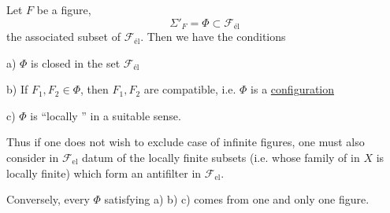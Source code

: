 Let $F$ be a figure, 
\[
\Sigma'_F=\Phi\subset\mathcal{F}_{\text{él}}
\]
the associated subset of $\mathcal{F}_{\text{él}}$. Then we have the conditions

a) $\Phi$ is closed in the  set $\mathcal{F}_{\text{él}}$

b) If  $F_1,F_2\in\Phi$,  then $F_1,F_2$ are compatible, i.e. $\Phi$ is a \uline{configuration}

c) $\Phi$ is ``locally '' in a suitable sense.

Thus if one does not wish to exclude  case of infinite figures, one must also consider in $\mathcal{F}_{\text{el}}$  datum of the locally finite subsets (i.e. whose family of  in $X$ is locally finite) which form an antifilter in $\mathcal{F}_{\text{el}}$.

Conversely, every $\Phi$ satisfying a) b) c) comes from one and only one figure.
